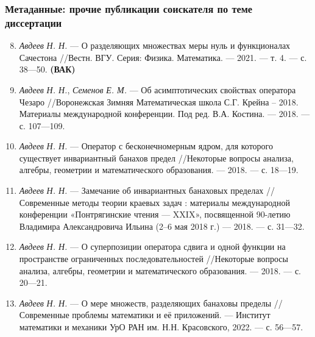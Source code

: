 \begin{frame}\frametitle{Метаданные: прочие публикации соискателя по теме диссертации}
	\begin{enumerate}
		\setcounter{enumi}{7}
		\item
		\emph{Авдеев} \emph{Н. Н.} — О разделяющих множествах меры нуль и
		функционалах Сачестона //Вестн. ВГУ. Серия: Физика. Математика. — 2021. —
		т. 4. — с. 38—50.
		\hfill\textbf{(ВАК)}
		{}
		\item
		\emph{Авдеев} \emph{Н. Н.}, \emph{Семенов} \emph{Е. М.} — Об
		асимптотических свойствах оператора Чезаро //Воронежская Зимняя
		Математическая школа С.Г. Крейна – 2018. Материалы международной
		конференции. Под ред. В.А. Костина. — 2018. — с. 107—109.
		{}
		\item
		\emph{Авдеев} \emph{Н. Н.} — Оператор с бесконечномерным ядром, для которого
		существует инвариантный банахов предел //Некоторые вопросы анализа,
		алгебры, геометрии и математического образования. — 2018. — с. 18—19.
		{}
		\item
		\emph{Авдеев} \emph{Н. Н.} — Замечание об инвариантных банаховых пределах
		//Современные методы теории краевых задач : материалы международной
		конференции «Понтрягинские чтения — XXIX», посвященной 90-летию Владимира
		Александровича Ильина (2–6 мая 2018 г.) — 2018. — с. 31—32.
		{}
		\item
		\emph{Авдеев} \emph{Н. Н.} — О суперпозиции оператора сдвига и одной функции
		на пространстве ограниченных последовательностей //Некоторые вопросы
		анализа, алгебры, геометрии и математического образования. — 2018. — с. 20—21.
		{}
		\item
		\emph{Авдеев} \emph{Н. Н.} — О мере множеств, разделяющих банаховы пределы
		 //Современные проблемы математики и её приложений. — Институт математики
		и механики УрО РАН им. Н.Н. Красовского, 2022. — с. 56—57.



	\end{enumerate}

\end{frame}



